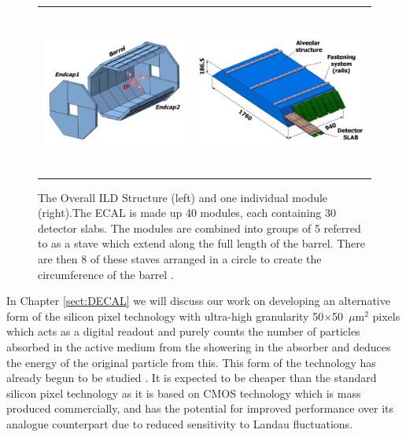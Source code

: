 \begin{figure}[h]
  \centering
  \begin{tabular}[c]{cc}
  \includegraphics[height=5.5cm]{Experiments/fig/ECALview_global_annot} &
  \includegraphics[height=5.5cm]{Experiments/fig/ECALview_module_annot} 
  \end{tabular}
  \caption[ECAL Structure]{The Overall ILD Structure (left) and one individual module (right).The ECAL is made up 40 modules, each containing 30 detector slabs. The modules are combined into groups of 5 referred to as a stave which extend along the full length of the barrel. There are then 8 of these staves arranged in a circle to create the circumference of the barrel \cite{ILD}.}
  \label{Fig:ECAL}
\end{figure}

In Chapter \ref{sect:DECAL} we will discuss our work on developing an alternative form of the silicon pixel technology with ultra-high granularity 50$\times$50~$\mu$m$^2$ pixels which acts as a digital readout and purely counts the number of particles absorbed in the active medium from the showering in the absorber and deduces the energy of the original particle from this.  This form of the technology has already begun to be studied \cite{2011JInst...6.5009B}. It is expected to be cheaper than the standard silicon pixel technology as it is based on \ac{CMOS} technology which is mass produced commercially, and has the potential for improved performance over its analogue counterpart due to reduced sensitivity to Landau fluctuations.

